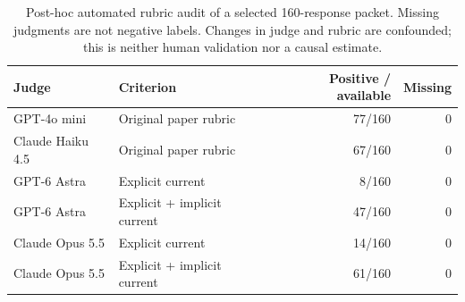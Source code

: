 \begin{table}[t]
\centering\small
\begin{tabular}{llrr}
\hline
Judge & Criterion & Positive / available & Missing \\
\hline
GPT-4o mini & Original paper rubric & 77/160 & 0 \\
Claude Haiku 4.5 & Original paper rubric & 67/160 & 0 \\
GPT-6 Astra & Explicit current & 8/160 & 0 \\
GPT-6 Astra & Explicit + implicit current & 47/160 & 0 \\
Claude Opus 5.5 & Explicit current & 14/160 & 0 \\
Claude Opus 5.5 & Explicit + implicit current & 61/160 & 0 \\
\hline
\end{tabular}
\caption{Post-hoc automated rubric audit of a selected 160-response packet. Missing judgments are not negative labels. Changes in judge and rubric are confounded; this is neither human validation nor a causal estimate.}
\label{tab:automated-rubric-audit}
\end{table}
